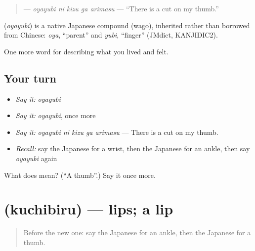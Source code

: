 \begin{quote}
\textbf{  } — \emph{oyayubi ni kizu ga arimasu} — \textquotedblleft{}There is a cut on my thumb.\textquotedblright{}
\end{quote}

\begin{cousinweb}
\textbf{} (\emph{oyayubi}) is a native Japanese compound (wago), inherited rather than borrowed from Chinese: \emph{oya}, \textquotedblleft{}parent\textquotedblright{} and \emph{yubi}, \textquotedblleft{}finger\textquotedblright{} (JMdict, KANJIDIC2).
\end{cousinweb}

\begin{grammarlens}[title={What you've built}]
One more word for describing what you lived and felt.
\end{grammarlens}

\subsection*{Your turn}
\begin{itemize}
\raggedright
  \item \emph{Say it:} \emph{oyayubi}
  \item \emph{Say it:} \emph{oyayubi}, once more
  \item \emph{Say it:} \emph{oyayubi ni kizu ga arimasu} — There is a cut on my thumb.
  \item \emph{Recall:} say the Japanese for a wrist, then the Japanese for an ankle, then say \emph{oyayubi} again
\end{itemize}

\begin{tcolorbox}[breakable,colback=teal!4,colframe=teal!35!black,title={Before you move on}]
What does  mean? (\textquotedblleft{}A thumb\textquotedblright{}.) Say it once more.
\end{tcolorbox}
\section[\texorpdfstring{\ja{くちびる} (kuchibiru)}{くちびる (kuchibiru)}]{ (kuchibiru) — lips; a lip}

\label{lesson:JA-C443-kuchibiru}



\begin{quote}
Before the new one: say the Japanese for an ankle, then the Japanese for a thumb.
\end{quote}

